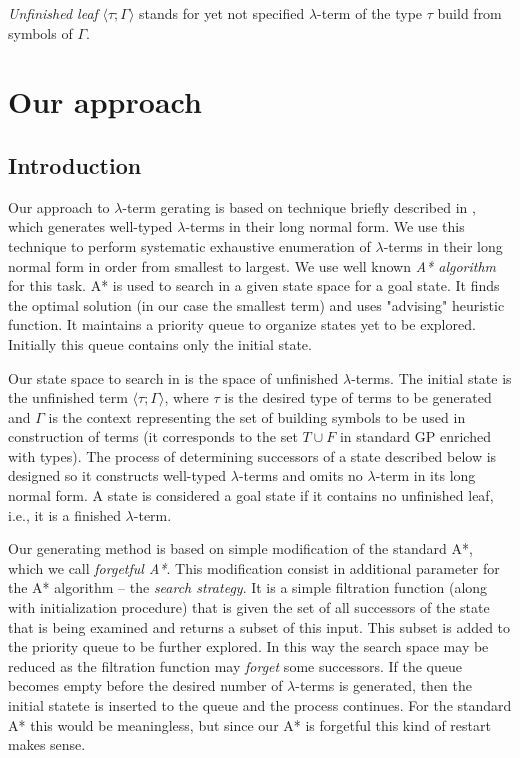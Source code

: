 \documentclass{llncs}
\newcommand{\lterm}{$\lambda$-term\xspace}
\newcommand{\lterms}{$\lambda$-terms\xspace}
\newcommand{\ul}[2]{\langle #1 ; #2 \rangle}
\begin{document}
\textit{Unfinished leaf} $\ul{\tau}{\Gamma}$ 
stands for yet not specified \lterm of the type $\tau$ 
build from symbols of $\Gamma$.


\section{Our approach}
\label{approach}
\subsection{Introduction}

Our approach to \lterm gerating is based on technique 
briefly described in \cite{barendregt10}, which generates
well-typed \lterms in their long normal form. 
We use this technique to perform systematic exhaustive enumeration
of \lterms in their long normal form in order from smallest to largest.
We use well known \textit{A* algorithm} \cite{AIMA} for this task.
A* is used to search in a given state space for a goal state. 
It finds the optimal solution (in our case the smallest term)
and uses "advising" heuristic function.
It maintains a priority queue to organize states yet to be explored.
Initially this queue contains only the initial state.  

Our state space to search in is the space of unfinished \lterms. 
The initial state is the unfinished term $\ul{\tau}{\Gamma}$, 
where $\tau$ is the desired type of
terms to be generated and $\Gamma$ is the context
representing the set of building symbols to be used in construction of
terms (it corresponds to the set $T \cup F$ in
standard GP enriched with types). The process of determining 
successors of a state described below is designed so it constructs well-typed 
\lterms and omits no \lterm in its long normal form. 
A state is considered a goal state if it contains no unfinished
leaf, i.e., it is a finished \lterm.

Our generating method is based on simple modification of the
standard A*, which we call \textit{forgetful A*}. This modification consist in 
additional parameter for the A* algorithm -- the \textit{search strategy}. 
It is a simple filtration function (along with initialization procedure)
that is given the set of all successors of the state that is being examined
and returns a subset of this input. This subset is added to the priority queue 
to be further explored. In this way the search space may be reduced as 
the filtration function may \textit{forget} some successors.
If the queue becomes empty before the desired number of \lterms
is generated, then the initial statete is inserted to the queue
and the process continues. For the standard A* this would be meaningless,
but since our A* is forgetful this kind of restart makes sense.
\end{document}
